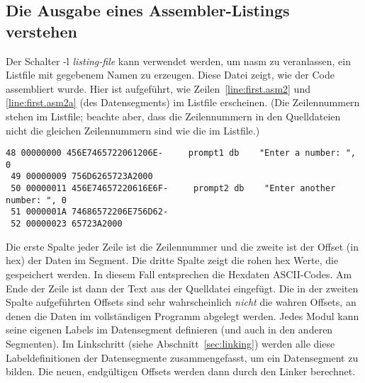 {\subsection{Die Ausgabe eines Assembler-Listings verstehen }

Der Schalter {\code -l {\em listing-file}} kann verwendet werden, um
{\code nasm}  zu veranlassen, ein Listfile mit
gegebenem Namen zu erzeugen. Diese Datei zeigt, wie der Code
assembliert wurde. Hier ist aufgef\"{u}hrt, wie
Zeilen~\ref{line:first.asm2} und \ref{line:first.asm2a} (des
Datensegments) im Listfile erscheinen. (Die Zeilennummern stehen im
Listfile; beachte aber, dass die Zeilennummern in den Quelldateien
nicht die gleichen Zeilennummern sind wie die im Listfile.)
\begin{Verbatim}[xleftmargin=\AsmMargin]
 48 00000000 456E7465722061206E-     prompt1 db    "Enter a number: ", 0
 49 00000009 756D6265723A2000
 50 00000011 456E74657220616E6F-     prompt2 db    "Enter another number: ", 0
 51 0000001A 74686572206E756D62-
 52 00000023 65723A2000
 \end{Verbatim}
Die erste Spalte jeder Zeile ist die Zeilennummer und die zweite ist
der Offset (in hex) der Daten im Segment. Die dritte Spalte zeigt
die rohen hex Werte, die gespeichert werden. In diesem Fall
entsprechen die Hexdaten ASCII-Codes. Am Ende der Zeile ist dann der
Text aus der Quelldatei eingef\"{u}gt. Die in der zweiten Spalte
aufgef\"{u}hrten Offsets sind sehr wahrscheinlich \emph{nicht} die
wahren Offsets, an denen die Daten im vollst\"{a}ndigen Programm
abgelegt werden. Jedes Modul kann seine eigenen Labels im
Datensegment definieren (und auch in den anderen Segmenten). Im
Linkschritt (siehe Abschnitt~\ref{sec:linking}) werden alle diese
Labeldefinitionen der Datensegmente zusammengefasst, um ein
Datensegment zu bilden. Die neuen, endg\"{u}ltigen Offsets werden dann
durch den Linker berechnet.

}

